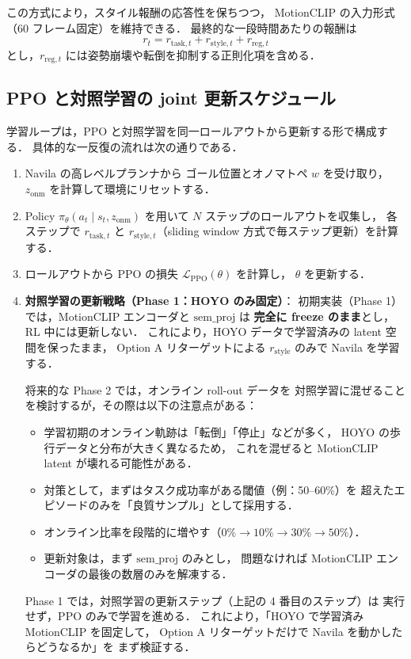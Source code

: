 \documentclass[a4paper,10pt]{jsarticle}
\begin{document}
この方式により，スタイル報酬の応答性を保ちつつ，
MotionCLIP の入力形式（60 フレーム固定）を維持できる．
最終的な一段時間あたりの報酬は
\[
  r_t = r_{\mathrm{task}, t} + r_{\mathrm{style}, t} + r_{\mathrm{reg}, t}
\]
とし，$r_{\mathrm{reg}, t}$ には姿勢崩壊や転倒を抑制する正則化項を含める．

\subsection{PPO と対照学習の joint 更新スケジュール}

学習ループは，PPO と対照学習を同一ロールアウトから更新する形で構成する．
具体的な一反復の流れは次の通りである．
\begin{enumerate}
  \item Navila の高レベルプランナから
        ゴール位置とオノマトペ $w$ を受け取り，
        $z_{\mathrm{onm}}$ を計算して環境にリセットする．
  \item Policy $\pi_\theta(a_t \mid s_t, z_{\mathrm{onm}})$ を用いて
        $N$ ステップのロールアウトを収集し，
        各ステップで $r_{\mathrm{task}, t}$ と
        $r_{\mathrm{style}, t}$（sliding window 方式で毎ステップ更新）を計算する．
  \item ロールアウトから PPO の損失 $\mathcal{L}_{\mathrm{PPO}}(\theta)$ を計算し，
        $\theta$ を更新する．
  \item \textbf{対照学習の更新戦略（Phase 1：HOYO のみ固定）}：
    初期実装（Phase 1）では，MotionCLIP エンコーダと $\mathrm{sem\_proj}$ は
    \textbf{完全に freeze のまま}とし，RL 中には更新しない．
    これにより，HOYO データで学習済みの latent 空間を保ったまま，
    Option A リターゲットによる $r_{\mathrm{style}}$ のみで Navila を学習する．
    
    将来的な Phase 2 では，オンライン roll-out データを
    対照学習に混ぜることを検討するが，その際は以下の注意点がある：
    \begin{itemize}
      \item 学習初期のオンライン軌跡は「転倒」「停止」などが多く，
            HOYO の歩行データと分布が大きく異なるため，
            これを混ぜると MotionCLIP latent が壊れる可能性がある．
      \item 対策として，まずはタスク成功率がある閾値（例：50--60\%）を
            超えたエピソードのみを「良質サンプル」として採用する．
      \item オンライン比率を段階的に増やす（$0\% \rightarrow 10\% \rightarrow 30\% \rightarrow 50\%$）．
      \item 更新対象は，まず $\mathrm{sem\_proj}$ のみとし，
            問題なければ MotionCLIP エンコーダの最後の数層のみを解凍する．
    \end{itemize}
    
    Phase 1 では，対照学習の更新ステップ（上記の 4 番目のステップ）は
    実行せず，PPO のみで学習を進める．
    これにより，「HOYO で学習済み MotionCLIP を固定して，
    Option A リターゲットだけで Navila を動かしたらどうなるか」を
    まず検証する．
\end{enumerate}
\end{document}
